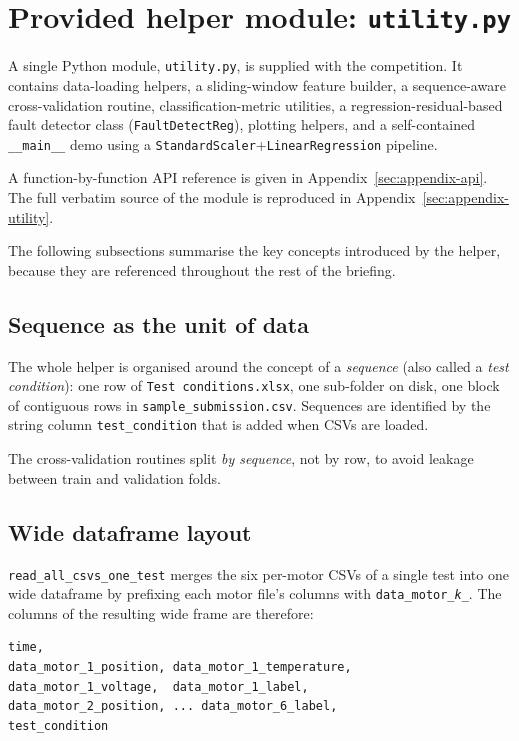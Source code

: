 \documentclass[11pt,a4paper]{article}
\begin{document}
\section{Provided helper module: \texttt{utility.py}}
\label{sec:utility}

A single Python module, \texttt{utility.py}, is supplied with the competition.
It contains data-loading helpers, a sliding-window feature builder, a
sequence-aware cross-validation routine, classification-metric utilities, a
regression-residual-based fault detector class
(\texttt{FaultDetectReg}), plotting helpers, and a self-contained
\texttt{\_\_main\_\_} demo using a \texttt{StandardScaler}+\texttt{LinearRegression}
pipeline.

A function-by-function API reference is given in
Appendix~\ref{sec:appendix-api}. The full verbatim source of the module is
reproduced in Appendix~\ref{sec:appendix-utility}.

The following subsections summarise the key concepts introduced by the helper,
because they are referenced throughout the rest of the briefing.

\subsection{Sequence as the unit of data}

The whole helper is organised around the concept of a \emph{sequence} (also
called a \emph{test condition}): one row of \texttt{Test conditions.xlsx}, one
sub-folder on disk, one block of contiguous rows in
\texttt{sample\_submission.csv}. Sequences are identified by the string column
\texttt{test\_condition} that is added when CSVs are loaded.

The cross-validation routines split \emph{by sequence}, not by row, to avoid
leakage between train and validation folds.

\subsection{Wide dataframe layout}

\texttt{read\_all\_csvs\_one\_test} merges the six per-motor CSVs of a single
test into one wide dataframe by prefixing each motor file's columns with
\texttt{data\_motor\_\textit{k}\_}. The columns of the resulting wide frame
are therefore:

\begin{verbatim}
time,
data_motor_1_position, data_motor_1_temperature,
data_motor_1_voltage,  data_motor_1_label,
data_motor_2_position, ... data_motor_6_label,
test_condition
\end{verbatim}
\end{document}
